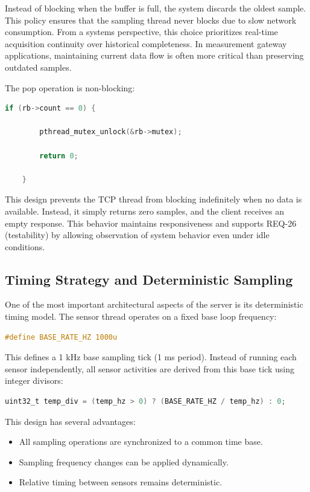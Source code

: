 Instead of blocking when the buffer is full, the system discards the oldest sample. This policy ensures that the sampling thread never blocks due to slow network consumption. From a systems perspective, this choice prioritizes real-time acquisition continuity over historical completeness. In measurement gateway applications, maintaining current data flow is often more critical than preserving outdated samples.

The pop operation is non-blocking:

\begin{lstlisting}[language=C]
	if (rb->count == 0) {
		
		pthread_mutex_unlock(&rb->mutex);
		
		return 0;
		
	}
\end{lstlisting}

This design prevents the TCP thread from blocking indefinitely when no data is available. Instead, it simply returns zero samples, and the client receives an empty response. This behavior maintains responsiveness and supports REQ-26 (testability) by allowing observation of system behavior even under idle conditions.

\subsection{Timing Strategy and Deterministic Sampling}

One of the most important architectural aspects of the server is its deterministic timing model. The sensor thread operates on a fixed base loop frequency:

\begin{lstlisting}[language=C]
	#define BASE_RATE_HZ 1000u
\end{lstlisting}

This defines a 1 kHz base sampling tick (1 ms period). Instead of running each sensor independently, all sensor activities are derived from this base tick using integer divisors:

\begin{lstlisting}[language=C]
	uint32_t temp_div = (temp_hz > 0) ? (BASE_RATE_HZ / temp_hz) : 0;
\end{lstlisting}

This design has several advantages:

\begin{itemize}
	\item All sampling operations are synchronized to a common time base.
	\item Sampling frequency changes can be applied dynamically.
	\item Relative timing between sensors remains deterministic.
\end{itemize}

